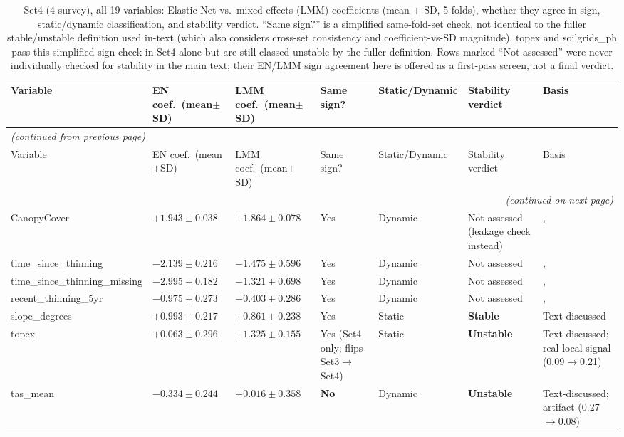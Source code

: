 {\scriptsize
\setlength{\tabcolsep}{2pt}
\renewcommand{\arraystretch}{1.05}
\begin{longtable}{p{2.6cm}p{1.5cm}p{1.5cm}p{1.3cm}p{1.7cm}p{1.6cm}p{2.6cm}}
\caption{\small{Set4 (4-survey), all 19 variables: Elastic Net vs.\ mixed-effects (LMM) coefficients (mean $\pm$ SD, 5 folds), whether they agree in sign, static/dynamic classification, and stability verdict. ``Same sign?'' is a simplified same-fold-set check, not identical to the fuller stable/unstable definition used in-text (which also considers cross-set consistency and coefficient-vs-SD magnitude), topex and soilgrids\_ph pass this simplified sign check in Set4 alone but are still classed unstable by the fuller definition. Rows marked ``Not assessed'' were never individually checked for stability in the main text; their EN/LMM sign agreement here is offered as a first-pass screen, not a final verdict.}}
\label{tab:q1-set4-full-variable-table} \\
\toprule
Variable & EN coef.\ (mean$\pm$SD) & LMM coef.\ (mean$\pm$SD) & Same sign? & Static/Dynamic & Stability verdict & Basis \\
\midrule
\endfirsthead
\multicolumn{7}{l}{\normalfont\itshape (continued from previous page)} \\
\toprule
Variable & EN coef.\ (mean$\pm$SD) & LMM coef.\ (mean$\pm$SD) & Same sign? & Static/Dynamic & Stability verdict & Basis \\
\midrule
\endhead
\bottomrule
\multicolumn{7}{r}{\normalfont\itshape (continued on next page)} \\
\endfoot
\bottomrule
\endlastfoot
CanopyCover & $+1.943\pm0.038$ & $+1.864\pm0.078$ & Yes & Dynamic & Not assessed (leakage check instead) &, \\
time\_since\_thinning & $-2.139\pm0.216$ & $-1.475\pm0.596$ & Yes & Dynamic & Not assessed &, \\
time\_since\_thinning\_missing & $-2.995\pm0.182$ & $-1.321\pm0.698$ & Yes & Dynamic & Not assessed &, \\
recent\_thinning\_5yr & $-0.975\pm0.273$ & $-0.403\pm0.286$ & Yes & Dynamic & Not assessed &, \\
slope\_degrees & $+0.993\pm0.217$ & $+0.861\pm0.238$ & Yes & Static & \textbf{Stable} & Text-discussed \\
topex & $+0.063\pm0.296$ & $+1.325\pm0.155$ & Yes (Set4 only; flips Set3$\to$Set4) & Static & \textbf{Unstable} & Text-discussed; real local signal (0.09$\to$0.21) \\
tas\_mean & $-0.334\pm0.244$ & $+0.016\pm0.358$ & \textbf{No} & Dynamic & \textbf{Unstable} & Text-discussed; artifact (0.27$\to$0.08) \\

\end{longtable}}
